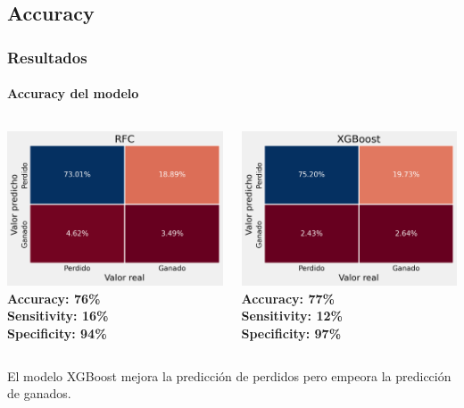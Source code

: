 \documentclass[aspectratio=149]{beamer}
\begin{document}
\subsection{Accuracy}
\begin{frame}
	\frametitle{Resultados}
	\framesubtitle{Accuracy del modelo}
	\begin{columns}
		\begin{column}{0.50\textwidth}
			\centering
			\includegraphics[width=\textwidth]{rfc-cm.png} \\
			\textbf{Accuracy: 76\%} \\
			\textbf{Sensitivity: 16\%} \\
			\textbf{Specificity: 94\%}

		\end{column}
		\begin{column}{0.50\textwidth}
			\centering
			\includegraphics[width=\textwidth]{xgb-cm.png} \\
			\textbf{Accuracy: 77\%} \\
			\textbf{Sensitivity: 12\%} \\
			\textbf{Specificity: 97\%}

		\end{column}
	\end{columns}
	\vspace{0.3cm}
	El modelo XGBoost mejora la predicción de perdidos pero empeora la predicción de ganados.
\end{frame}
\end{document}

